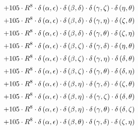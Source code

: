 \begin{subequations}
\begin{gather}
 \\[0.2em] \notag 		 + 105 \cdot R^{8} \cdot \delta{}\left(\alpha{}, \epsilon{}\right) \cdot \delta{}\left(\beta{}, \delta{}\right) \cdot \delta{}\left(\gamma{}, \zeta{}\right) \cdot \delta{}\left(\eta{}, \theta{}\right) 
 \\[0.2em] \notag 		 + 105 \cdot R^{8} \cdot \delta{}\left(\alpha{}, \epsilon{}\right) \cdot \delta{}\left(\beta{}, \delta{}\right) \cdot \delta{}\left(\gamma{}, \eta{}\right) \cdot \delta{}\left(\zeta{}, \theta{}\right) 
 \\[0.2em] \notag 		 + 105 \cdot R^{8} \cdot \delta{}\left(\alpha{}, \epsilon{}\right) \cdot \delta{}\left(\beta{}, \delta{}\right) \cdot \delta{}\left(\gamma{}, \theta{}\right) \cdot \delta{}\left(\zeta{}, \eta{}\right) 
 \\[0.2em] \notag 		 + 105 \cdot R^{8} \cdot \delta{}\left(\alpha{}, \epsilon{}\right) \cdot \delta{}\left(\beta{}, \zeta{}\right) \cdot \delta{}\left(\gamma{}, \delta{}\right) \cdot \delta{}\left(\eta{}, \theta{}\right) 
 \\[0.2em] \notag 		 + 105 \cdot R^{8} \cdot \delta{}\left(\alpha{}, \epsilon{}\right) \cdot \delta{}\left(\beta{}, \zeta{}\right) \cdot \delta{}\left(\gamma{}, \eta{}\right) \cdot \delta{}\left(\delta{}, \theta{}\right) 
 \\[0.2em] \notag 		 + 105 \cdot R^{8} \cdot \delta{}\left(\alpha{}, \epsilon{}\right) \cdot \delta{}\left(\beta{}, \zeta{}\right) \cdot \delta{}\left(\gamma{}, \theta{}\right) \cdot \delta{}\left(\delta{}, \eta{}\right) 
 \\[0.2em] \notag 		 + 105 \cdot R^{8} \cdot \delta{}\left(\alpha{}, \epsilon{}\right) \cdot \delta{}\left(\beta{}, \eta{}\right) \cdot \delta{}\left(\gamma{}, \delta{}\right) \cdot \delta{}\left(\zeta{}, \theta{}\right) 
 \\[0.2em] \notag 		 + 105 \cdot R^{8} \cdot \delta{}\left(\alpha{}, \epsilon{}\right) \cdot \delta{}\left(\beta{}, \eta{}\right) \cdot \delta{}\left(\gamma{}, \zeta{}\right) \cdot \delta{}\left(\delta{}, \theta{}\right) 
 \\[0.2em] \notag 		 + 105 \cdot R^{8} \cdot \delta{}\left(\alpha{}, \epsilon{}\right) \cdot \delta{}\left(\beta{}, \eta{}\right) \cdot \delta{}\left(\gamma{}, \theta{}\right) \cdot \delta{}\left(\delta{}, \zeta{}\right) 
 \\[0.2em] \notag 		 + 105 \cdot R^{8} \cdot \delta{}\left(\alpha{}, \epsilon{}\right) \cdot \delta{}\left(\beta{}, \theta{}\right) \cdot \delta{}\left(\gamma{}, \delta{}\right) \cdot \delta{}\left(\zeta{}, \eta{}\right) 

\end{gather}
\end{subequations}
